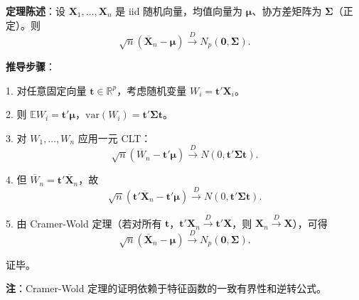 \textbf{定理陈述}：设 $\mathbf{X}_1, \ldots, \mathbf{X}_n$ 是 iid 随机向量，均值向量为 $\boldsymbol{\mu}$、协方差矩阵为 $\boldsymbol{\Sigma}$（正定）。则
\[
\sqrt{n}(\overline{\mathbf{X}}_n - \boldsymbol{\mu}) \xrightarrow{D} N_p(\mathbf{0}, \boldsymbol{\Sigma}).
\label{eq:multivariate-clt-full}
\]

\textbf{推导步骤}：

1. 对任意固定向量 $\mathbf{t} \in \mathbb{R}^p$，考虑随机变量 $W_i = \mathbf{t}'\mathbf{X}_i$。

2. 则 $\mathbb{E}W_i = \mathbf{t}'\boldsymbol{\mu}$，$\text{var}(W_i) = \mathbf{t}'\boldsymbol{\Sigma}\mathbf{t}$。

3. 对 $W_1, \ldots, W_n$ 应用一元 CLT：
\[
\sqrt{n}(\overline{W}_n - \mathbf{t}'\boldsymbol{\mu}) \xrightarrow{D} N(0, \mathbf{t}'\boldsymbol{\Sigma}\mathbf{t}).
\label{eq:multivariate-clt-linear}
\]

4. 但 $\overline{W}_n = \mathbf{t}'\overline{\mathbf{X}}_n$，故
\[
\sqrt{n}(\mathbf{t}'\overline{\mathbf{X}}_n - \mathbf{t}'\boldsymbol{\mu}) \xrightarrow{D} N(0, \mathbf{t}'\boldsymbol{\Sigma}\mathbf{t}).
\label{eq:multivariate-clt-linear2}
\]

5. 由 Cramer-Wold 定理（若对所有 $\mathbf{t}$，$\mathbf{t}'\mathbf{X}_n \xrightarrow{D} \mathbf{t}'\mathbf{X}$，则 $\mathbf{X}_n \xrightarrow{D} \mathbf{X}$），可得
\[
\sqrt{n}(\overline{\mathbf{X}}_n - \boldsymbol{\mu}) \xrightarrow{D} N_p(\mathbf{0}, \boldsymbol{\Sigma}).
\label{eq:multivariate-clt-final}
\]

证毕。

\textbf{注}：Cramer-Wold 定理的证明依赖于特征函数的一致有界性和逆转公式。
